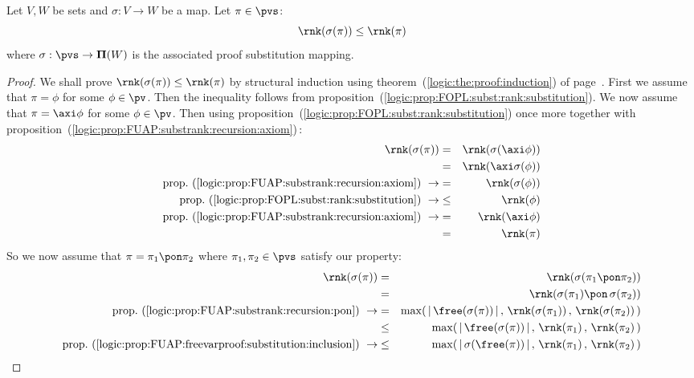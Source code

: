 \begin{prop}\label{logic:prop:FUAP:substrank:substitution}
Let $V,W$ be sets and $\sigma:V\to W$ be a map. Let $\pi\in\pvs$:
    \[
    \rnk(\sigma(\pi))\leq\rnk(\pi)
    \]
where $\sigma:\pvs\to{\bf\Pi}(W)$ is the associated proof
substitution mapping.
\end{prop}
\begin{proof}
We shall prove $\rnk(\sigma(\pi))\leq\rnk(\pi)$ by structural
induction using theorem~(\ref{logic:the:proof:induction}) of
page~\pageref{logic:the:proof:induction}. First we assume that
$\pi=\phi$ for some $\phi\in\pv$. Then the inequality follows from
proposition~(\ref{logic:prop:FOPL:subst:rank:substitution}). We now
assume that $\pi=\axi\phi$ for some $\phi\in\pv$. Then using
proposition~(\ref{logic:prop:FOPL:subst:rank:substitution}) once
more together with
proposition~(\ref{logic:prop:FUAP:substrank:recursion:axiom})\,:
    \begin{eqnarray*}
    \rnk(\sigma(\pi))&=&\rnk(\sigma(\axi\phi))\\
    &=&\rnk(\axi\sigma(\phi))\\
    \mbox{prop.~(\ref{logic:prop:FUAP:substrank:recursion:axiom})}\ \rightarrow
    &=&\rnk(\sigma(\phi))\\
    \mbox{prop.~(\ref{logic:prop:FOPL:subst:rank:substitution})}\ \rightarrow
    &\leq&\rnk(\phi)\\
    \mbox{prop.~(\ref{logic:prop:FUAP:substrank:recursion:axiom})}\ \rightarrow
    &=&\rnk(\axi\phi)\\
    &=&\rnk(\pi)\\
    \end{eqnarray*}
So we now assume that $\pi=\pi_{1}\pon\pi_{2}$ where
$\pi_{1},\pi_{2}\in\pvs$ satisfy our property:
    \begin{eqnarray*}
    \rnk(\sigma(\pi))&=&\rnk(\sigma(\pi_{1}\pon\pi_{2}))\\
    &=&\rnk(\sigma(\pi_{1})\pon\,\sigma(\pi_{2}))\\
    \mbox{prop.~(\ref{logic:prop:FUAP:substrank:recursion:pon})}\ \rightarrow
    &=&\max(\,|\,\free(\sigma(\pi))\,|\,,\,
    \rnk(\sigma(\pi_{1}))\,,\,\rnk(\sigma(\pi_{2}))\,)\\
    &\leq&\max(\,|\,\free(\sigma(\pi))\,|\,,\,
    \rnk(\pi_{1})\,,\,\rnk(\pi_{2})\,)\\
    \mbox{prop.~(\ref{logic:prop:FUAP:freevarproof:substitution:inclusion})}\ \rightarrow
    &\leq&\max(\,|\,\sigma(\free(\pi))\,|\,,\,
    \rnk(\pi_{1})\,,\,\rnk(\pi_{2})\,)\\

\end{eqnarray*}
\end{proof}
